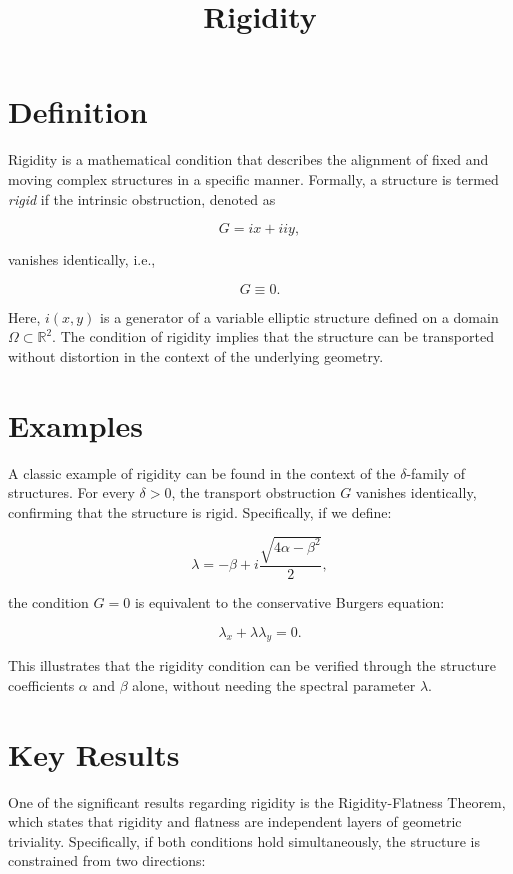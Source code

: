 \documentclass[11pt,a4paper]{article}
\title{Rigidity}
\date{}
\begin{document}
\maketitle
\section{Definition}
Rigidity is a mathematical condition that describes the alignment of fixed and moving complex structures in a specific manner. Formally, a structure is termed \textit{rigid} if the intrinsic obstruction, denoted as 

\begin{equation}
G = ix + i iy,
\end{equation}

vanishes identically, i.e., 

\begin{equation}
G \equiv 0.
\end{equation}

Here, $i(x, y)$ is a generator of a variable elliptic structure defined on a domain $\Omega \subset \mathbb{R}^2$. The condition of rigidity implies that the structure can be transported without distortion in the context of the underlying geometry.

\section{Examples}
A classic example of rigidity can be found in the context of the $\delta$-family of structures. For every $\delta > 0$, the transport obstruction $G$ vanishes identically, confirming that the structure is rigid. Specifically, if we define:

\begin{equation}
\lambda = -\beta + i \frac{\sqrt{4\alpha - \beta^2}}{2},
\end{equation}

the condition $G = 0$ is equivalent to the conservative Burgers equation:

\begin{equation}
\lambda_x + \lambda \lambda_y = 0.
\end{equation}

This illustrates that the rigidity condition can be verified through the structure coefficients $\alpha$ and $\beta$ alone, without needing the spectral parameter $\lambda$.

\section{Key Results}
One of the significant results regarding rigidity is the Rigidity-Flatness Theorem, which states that rigidity and flatness are independent layers of geometric triviality. Specifically, if both conditions hold simultaneously, the structure is constrained from two directions: 
\end{document}
